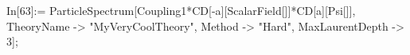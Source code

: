 In[63]:= ParticleSpectrum[Coupling1*CD[-a][ScalarField[]]*CD[a][Psi[]], TheoryName -> "MyVeryCoolTheory", Method -> "Hard", MaxLaurentDepth -> 3]; 
